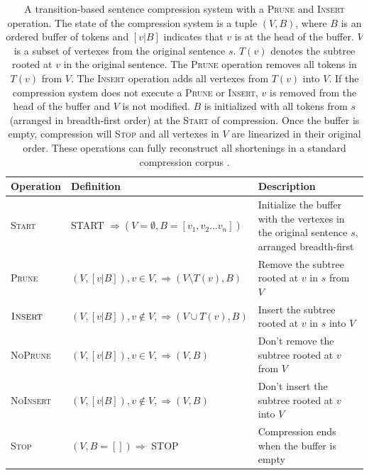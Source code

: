 \documentclass[11pt,a4paper]{article}
\begin{document}
\begin{table}[]
\centering
\begin{tabular}{llp{70mm}}
\textbf{Operation} &             \textbf{Definition}                                                    &      \textbf{Description}    \\ \hline
\textsc{Start}      & START $\Rightarrow ( V=\emptyset,  B=[v_1, v_2 ... v_n])$ & Initialize the buffer with the vertexes in the original sentence $s$, arranged breadth-first \\ \hline
\textsc{Prune}              & $(V, [v|B]), v \in V,  \Rightarrow (V \setminus  T(v), B)$ & Remove the subtree rooted at $v$ in $s$ from $V$ \\  
$\textsc{Insert}$             & $(V, [v|B]), v \notin V, \Rightarrow (V \cup T(v), B)$ & Insert the subtree rooted at $v$ in $s$ into $V$  \\ \hline
\textsc{NoPrune}           & $(V, [v|B]), v \in V, \Rightarrow (V, B)$ & Don't remove the subtree rooted at $v$ from $V$  \\ 
\textsc{NoInsert}          &       $(V, [v|B]), v \notin V, \Rightarrow (V, B)$ &   Don't insert the subtree rooted at $v$ into $V$    \\ \hline
\textsc{Stop}             & $ (V, B=[]) \Rightarrow$ STOP & Compression ends when the buffer is empty \\                                               
\end{tabular}
\caption{A transition-based sentence compression system with a \textsc{Prune} and \textsc{Insert} operation. The state of the compression system is a tuple $(V, B)$, where $B$ is an ordered buffer of tokens and $[v|B]$ indicates that $v$ is at the head of the buffer. $V$ is a subset of vertexes from the original sentence $s$. $T(v)$ denotes the subtree rooted at $v$ in the original sentence. The \textsc{Prune} operation removes all tokens in $T(v)$ from $V$. The \textsc{Insert} operation adds all vertexes from $T(v)$ into $V$. If the compression system does not execute a \textsc{Prune} or \textsc{Insert}, $v$ is removed from the head of the buffer and $V$ is not modified. $B$ is initialized with all tokens from $s$ (arranged in breadth-first order) at the \textsc{Start} of compression. Once the buffer is empty, compression will \textsc{Stop} and all vertexes in $V$ are linearized in their original order. These operations can fully reconstruct all shortenings in a standard compression corpus \cite{filippova2013overcoming}.}
\end{table}
\end{document}
